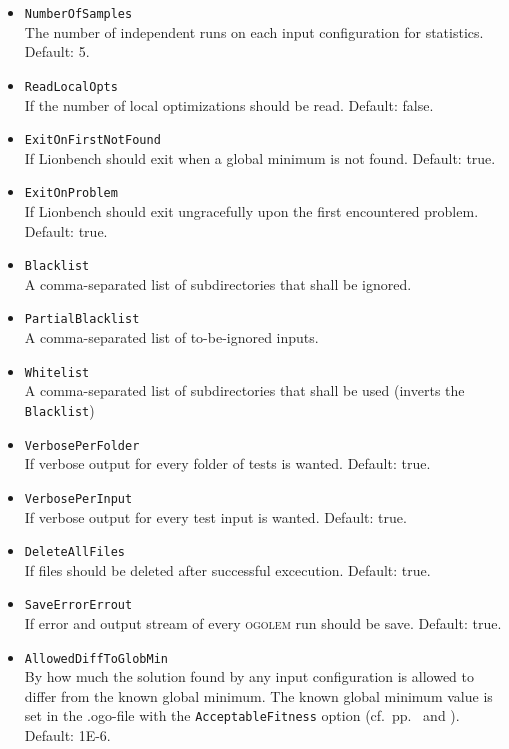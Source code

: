 \documentclass[a4paper,10pt]{scrbook}
\newcommand{\ogo}{\textsc{ogolem}}
\begin{document}
\begin{itemize}
 \item \texttt{NumberOfSamples}\\ The number of independent runs on each input 
configuration for statistics. Default: 5.
 \item \texttt{ReadLocalOpts}\\ If the number of local optimizations should be 
read. Default: false.
 \item \texttt{ExitOnFirstNotFound}\\ If Lionbench should exit when a global 
minimum is not found. Default: true.
 \item \texttt{ExitOnProblem}\\ If Lionbench should exit ungracefully upon the 
first encountered problem. Default: true.
 \item \texttt{Blacklist}\\ A comma-separated list of subdirectories that shall 
be ignored.
 \item \texttt{PartialBlacklist}\\ A comma-separated list of to-be-ignored 
inputs.
 \item \texttt{Whitelist}\\ A comma-separated list of subdirectories that shall 
be used (inverts the \texttt{Blacklist})
 \item \texttt{VerbosePerFolder}\\ If verbose output for every folder of tests 
is wanted. Default: true.
 \item \texttt{VerbosePerInput}\\ If verbose output for every test input is 
wanted. Default: true.
 \item \texttt{DeleteAllFiles}\\ If files should be deleted after successful 
excecution. Default: true.
 \item \texttt{SaveErrorErrout}\\ If error and output stream of every \ogo{} 
run should be save. Default: true.
 \item \texttt{AllowedDiffToGlobMin}\\ By how much the solution found by any 
input configuration is allowed to differ from the known global minimum. The
known global minimum value is set in the .ogo-file with the
\texttt{AcceptableFitness} option (cf.~pp.~\pageref{page1:acceptableFitness}
and \pageref{page2:acceptableFitness}).
Default: 1E-6.
\end{itemize}
\end{document}
